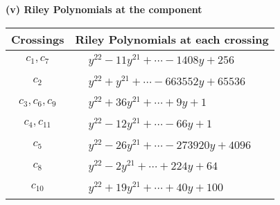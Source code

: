 \documentclass[1p]{elsarticle_modified}
\theoremstyle{definition}
\begin{document}
\flushleft \textbf{(v) Riley Polynomials at the component}\newline \\
\begin{tabular}{m{50pt}|m{274pt}}
Crossings & \hspace{64pt}Riley Polynomials at each crossing \\
\hline $$\begin{aligned}c_{1},c_{7}\end{aligned}$$&$\begin{aligned}
&y^{22}-11 y^{21}+\cdots-1408 y+256
\end{aligned}$\\
\hline $$\begin{aligned}c_{2}\end{aligned}$$&$\begin{aligned}
&y^{22}+y^{21}+\cdots-663552 y+65536
\end{aligned}$\\
\hline $$\begin{aligned}c_{3},c_{6},c_{9}\end{aligned}$$&$\begin{aligned}
&y^{22}+36 y^{21}+\cdots+9 y+1
\end{aligned}$\\
\hline $$\begin{aligned}c_{4},c_{11}\end{aligned}$$&$\begin{aligned}
&y^{22}-12 y^{21}+\cdots-66 y+1
\end{aligned}$\\
\hline $$\begin{aligned}c_{5}\end{aligned}$$&$\begin{aligned}
&y^{22}-26 y^{21}+\cdots-273920 y+4096
\end{aligned}$\\
\hline $$\begin{aligned}c_{8}\end{aligned}$$&$\begin{aligned}
&y^{22}-2 y^{21}+\cdots+224 y+64
\end{aligned}$\\
\hline $$\begin{aligned}c_{10}\end{aligned}$$&$\begin{aligned}
&y^{22}+19 y^{21}+\cdots+40 y+100
\end{aligned}$\\
\hline
\end{tabular}\\~\\
\end{document}
